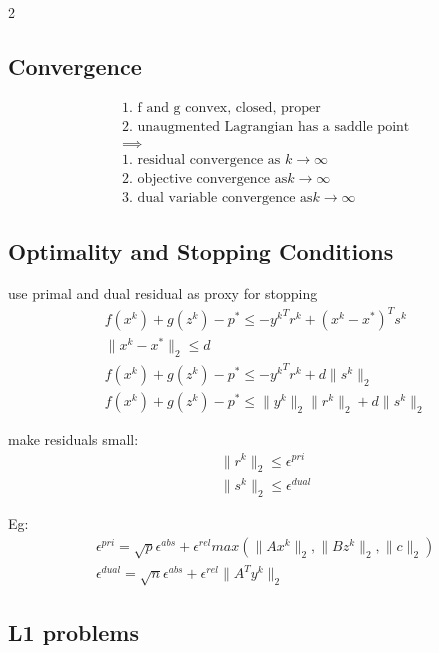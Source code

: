 \documentclass[8pt]{extarticle}
\newcommand{\norm}[1]{\|#1\|}
\begin{document}
\begin{multicols*}{2}
  \vfill\null
  \columnbreak
  
  \subsection{Convergence}
  \begin{align*}
    &\text{1. f and g convex, closed, proper}\\
    &\text{2. unaugmented Lagrangian has a saddle point}\\
    &\implies\\
    &\text{1. residual convergence as }k \rightarrow \infty\\
    &\text{2. objective convergence as}k \rightarrow \infty\\
    &\text{3. dual variable convergence as}k \rightarrow \infty
  \end{align*}
  
\subsection{Optimality and Stopping Conditions}
  use primal and dual residual as proxy for stopping\\
  \begin{align*}
    &f(x^k)+g(z^k)-p^* \leq -{y^k}^T r^k + (x^k-x^*)^T s^k\\
    &\norm{x^k-x^*}_2 \leq d\\
    &f(x^k)+g(z^k)-p^* \leq -{y^k}^T r^k + d \norm{s^k}_2\\
    &f(x^k)+g(z^k)-p^* \leq \norm{y^k}_2 \norm{r^k}_2 + d \norm{s^k}_2
  \end{align*}

  make residuals small:
  \begin{align*}
    &\norm{r^k}_2 \leq \epsilon^{pri}\\
    &\norm{s^k}_2 \leq \epsilon^{dual}
  \end{align*}

  Eg:
  \begin{align*}
    &\epsilon^{pri}=\sqrt{p} \epsilon^{abs} + \epsilon^{rel} max(\norm{Ax^k}_2, \norm{Bz^k}_2, \norm{c}_2)\\
    &\epsilon^{dual}=\sqrt{n} \epsilon^{abs} + \epsilon^{rel} \norm{A^T y^k}_2
  \end{align*}
    
  \vfill\null
  \columnbreak

  \subsection{L1 problems}
  

\end{multicols*}
\end{document}
